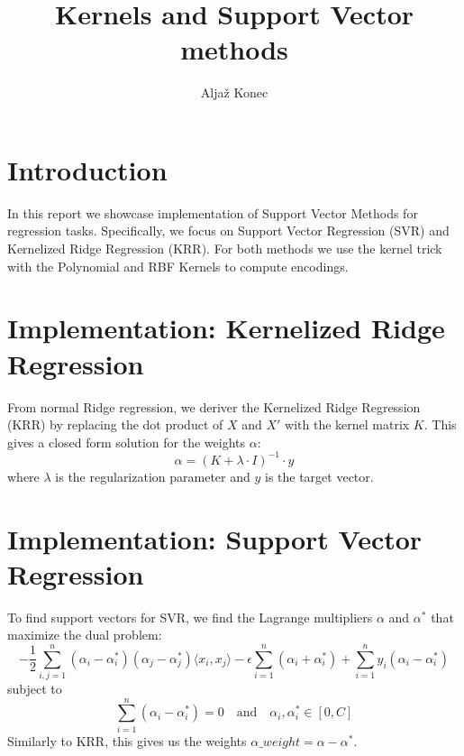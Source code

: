 \documentclass[9pt]{IEEEtran}
\title{\vspace{0ex} Kernels and Support Vector methods}
\author{Aljaž Konec\vspace{-4.0ex}}
\begin{document}
\maketitle

\section{Introduction}
In this report we showcase implementation of Support Vector Methods for regression tasks.
Specifically, we focus on Support Vector Regression (SVR) and Kernelized Ridge Regression (KRR).
For both methods we use the kernel trick with the Polynomial and RBF Kernels to compute encodings.



\section{Implementation: Kernelized Ridge Regression}
From normal Ridge regression, we deriver the Kernelized Ridge Regression (KRR) by replacing the dot product of $X$ and $X'$ with the kernel matrix $K$.
This gives a closed form solution for the weights $\alpha$:
$$\alpha = (K + \lambda \cdot I)^{-1} \cdot y$$
where $\lambda$ is the regularization parameter and $y$ is the target vector.


\section{Implementation: Support Vector Regression}
To find support vectors for SVR, we find the Lagrange multipliers $\alpha$ and $\alpha^*$ that maximize the dual problem:
\[
    -\frac{1}{2} \sum_{i,j=1}^n (\alpha_i - \alpha_i^*) (\alpha_j - \alpha_j^*) \langle x_i, x_j \rangle
    - \epsilon \sum_{i=1}^n (\alpha_i + \alpha_i^*)
    + \sum_{i=1}^n y_i (\alpha_i - \alpha_i^*)
\]
subject to
\[
    \sum_{i=1}^n (\alpha_i - \alpha_i^*) = 0 \quad \text{and} \quad \alpha_i, \alpha_i^* \in [0, C]
\]
Similarly to KRR, this gives us the weights $\alpha\_weight = \alpha - \alpha^*$. 
\end{document}
